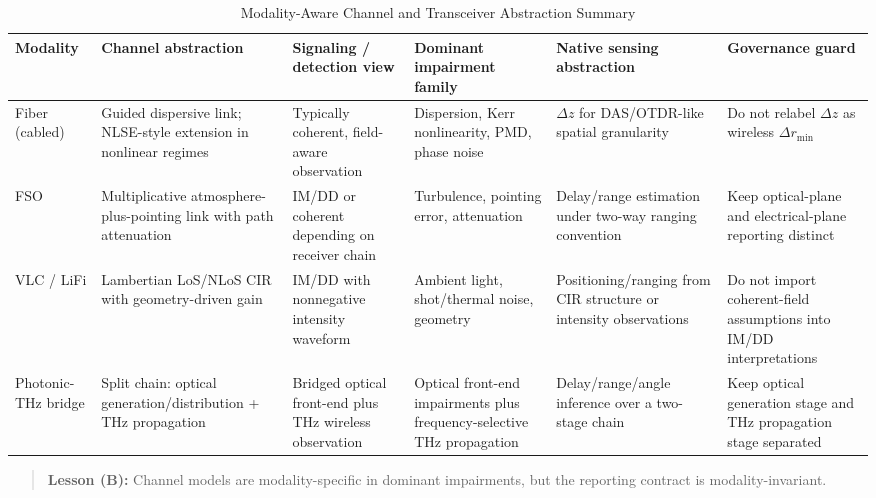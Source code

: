 \begin{table}[!t]
\caption{Modality-Aware Channel and Transceiver Abstraction Summary}
\label{tab:ii-channel-transceiver}
\centering
\footnotesize
\begin{tabularx}{\textwidth}{>{\raggedright\arraybackslash}p{} >{\raggedright\arraybackslash}p{} >{\raggedright\arraybackslash}p{} >{\raggedright\arraybackslash}p{} >{\raggedright\arraybackslash}p{} >{\raggedright\arraybackslash}p{}}
\toprule
\textbf{Modality} & \textbf{Channel abstraction} & \textbf{Signaling / detection view} & \textbf{Dominant impairment family} & \textbf{Native sensing abstraction} & \textbf{Governance guard} \\
\midrule
Fiber (cabled) & Guided dispersive link; NLSE-style extension in nonlinear regimes & Typically coherent, field-aware observation & Dispersion, Kerr nonlinearity, PMD, phase noise & $\Delta z$ for DAS/OTDR-like spatial granularity & Do not relabel $\Delta z$ as wireless $\Delta r_{\min}$ \\
FSO & Multiplicative atmosphere-plus-pointing link with path attenuation & IM/DD or coherent depending on receiver chain & Turbulence, pointing error, attenuation & Delay/range estimation under two-way ranging convention & Keep optical-plane and electrical-plane reporting distinct \\
VLC / LiFi & Lambertian LoS/NLoS CIR with geometry-driven gain & IM/DD with nonnegative intensity waveform & Ambient light, shot/thermal noise, geometry & Positioning/ranging from CIR structure or intensity observations & Do not import coherent-field assumptions into IM/DD interpretations \\
Photonic-THz bridge & Split chain: optical generation/distribution + THz propagation & Bridged optical front-end plus THz wireless observation & Optical front-end impairments plus frequency-selective THz propagation & Delay/range/angle inference over a two-stage chain & Keep optical generation stage and THz propagation stage separated \\
\bottomrule
\end{tabularx}
\end{table}

\begin{quote}
\textbf{Lesson (B):} Channel models are modality-specific in dominant impairments, but the reporting contract is modality-invariant.
\end{quote}

